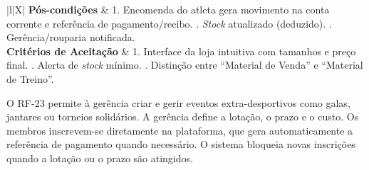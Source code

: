 {\begin{xltabular}{\textwidth}{|l|X|}
\textbf{Pós-condições} & 1. Encomenda do atleta gera movimento na conta corrente e referência de pagamento/recibo. . \textit{Stock} atualizado (deduzido). . Gerência/rouparia notificada. \\ \hline
\textbf{Critérios de Aceitação} & 1. Interface da loja intuitiva com tamanhos e preço final. . Alerta de \textit{stock} mínimo. . Distinção entre ``Material de Venda'' e ``Material de Treino''. \\
\end{xltabular}
}


O RF-23 permite à gerência criar e gerir eventos extra-desportivos como galas, jantares ou torneios solidários. A gerência define a lotação, o prazo e o custo. Os membros inscrevem-se diretamente na plataforma, que gera automaticamente a referência de pagamento quando necessário. O sistema bloqueia novas inscrições quando a lotação ou o prazo são atingidos.

